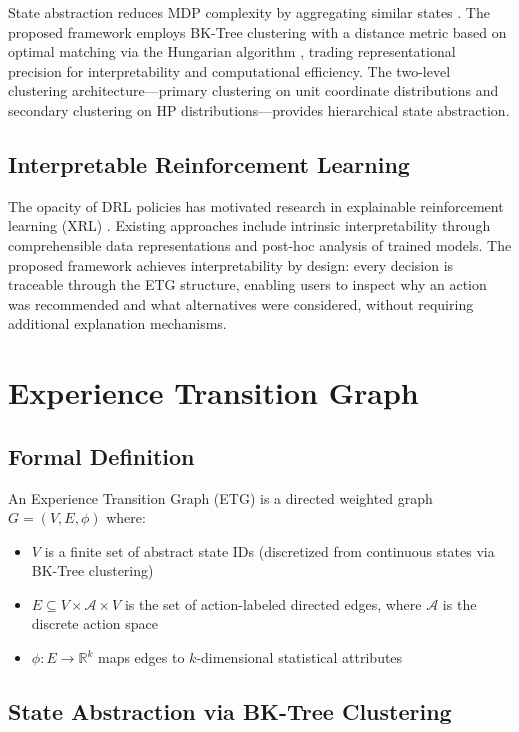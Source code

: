 \documentclass[letterpaper]{article}
\begin{document}
State abstraction reduces MDP complexity by aggregating similar states \citep{abel2018abstraction, starre2022survey}. The proposed framework employs BK-Tree clustering with a distance metric based on optimal matching via the Hungarian algorithm \citep{kuhn1955hungarian}, trading representational precision for interpretability and computational efficiency. The two-level clustering architecture---primary clustering on unit coordinate distributions and secondary clustering on HP distributions---provides hierarchical state abstraction.

\subsection{Interpretable Reinforcement Learning}

The opacity of DRL policies has motivated research in explainable reinforcement learning (XRL) \citep{puiutta2020xrl}. Existing approaches include intrinsic interpretability through comprehensible data representations and post-hoc analysis of trained models. The proposed framework achieves interpretability by design: every decision is traceable through the ETG structure, enabling users to inspect why an action was recommended and what alternatives were considered, without requiring additional explanation mechanisms.


\section{Experience Transition Graph}
\label{sec:etg}

\subsection{Formal Definition}

An Experience Transition Graph (ETG) is a directed weighted graph $G = (V, E, \phi)$ where:
\begin{itemize}
	\item $V$ is a finite set of abstract state IDs (discretized from continuous states via BK-Tree clustering)
	\item $E \subseteq V \times \mathcal{A} \times V$ is the set of action-labeled directed edges, where $\mathcal{A}$ is the discrete action space
	\item $\phi: E \rightarrow \mathbb{R}^k$ maps edges to $k$-dimensional statistical attributes
\end{itemize}

\subsection{State Abstraction via BK-Tree Clustering}
\end{document}
